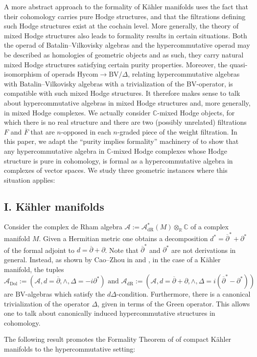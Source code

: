 \documentclass[a4paper]{amsart}
\theoremstyle{definition}
\theoremstyle{theorem}
\newcommand{\CC}{\mathbb{C}}
\newcommand{\RR}{\mathbb{R}}
\newcommand{\Aa}{\mathcal{A}}
\newcommand{\del}{\partial}
\newcommand{\delb}{{\overline\partial}}
\newcommand{\lra}{\longrightarrow}
\newcommand{\BV}{{\mathrm{BV}}}
\newcommand{\Hycom}{{\mathrm{Hycom}}}
\begin{document}
A more abstract approach to the formality of Kähler manifolds uses the fact that their cohomology carries pure Hodge structures, and that the filtrations defining such Hodge structures exist at the cochain level. 
More generally, the theory of mixed Hodge structures also leads to formality results in certain situations. 
Both the operad of Batalin--Vilkovisky algebras and the hypercommutative operad may be described as homologies of geometric objects and as such, they carry natural mixed Hodge structures satisfying certain purity properties. Moreover, the quasi-isomorphism of operads
$\Hycom\lra \BV/\Delta$, relating hypercommutative algebras with Batalin--Vilkovisky algebras with a trivialization of the BV-operator, is compatible with such mixed Hodge structures.
It therefore makes sense to talk about hypercommutative algebras in mixed Hodge structures and, more generally, in mixed Hodge complexes.
We actually consider $\CC$-mixed Hodge objects, for which there is no real structure and there are two (possibly unrelated) filtrations $F$ and $\overline{F}$ that are $n$-opposed in each $n$-graded piece of the weight filtration.
In this paper, we adapt the ``purity implies formality'' machinery of \cite{CiHo} to show that any hypercommutative algebra in $\CC$-mixed Hodge complexes whose Hodge structure is pure in cohomology, is formal as a hypercommutative algebra in complexes of vector spaces.
We study three geometric instances where this situation applies:

\subsection*{I. Kähler manifolds}
Consider the complex de Rham algebra
$\Aa:=\Aa^*_{\mathrm{dR}}(M)\otimes_\RR\CC$  of a complex manifold $M$. Given a Hermitian metric one obtains a decomposition $d^*=\delb^*+\del^*$ of the formal adjoint to $d=\delb+\del$.
Note that $\delb^*$ and $\del^*$ are not derivations in general. Instead, as shown by Cao--Zhou in \cite{CaZh} and \cite{CaZh2}, in the case of a Kähler manifold,
the tuples 
\[\Aa_{\mathrm{Dol}}:=(\Aa,d=\delb,\wedge,\Delta=-i\del^*)\text{ and }\Aa_{\mathrm{dR}}:=(\Aa,d=\delb+\del,\wedge,\Delta=i(\delb^*-\del^*))\] are $\BV$-algebras which satisfy the $d\Delta$-condition. Furthermore, there is a canonical trivialization of the operator $\Delta$, given in terms of the Green operator.
This allows one to talk about canonically induced hypercommutative structures in cohomology.

The following result promotes the Formality Theorem of \cite{DGMS} of compact Kähler manifolds to the hypercommutative setting:
\end{document}
